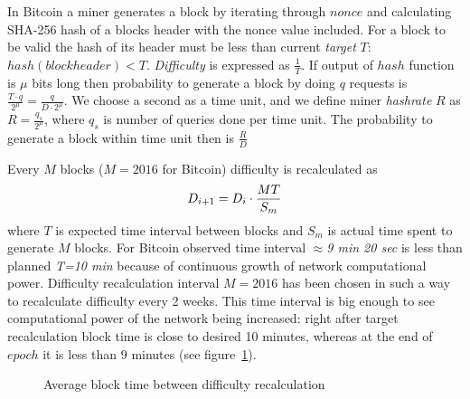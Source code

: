 \documentclass[]{llncs}
\begin{document}
In Bitcoin a miner generates a block by iterating through \(nonce\) and calculating SHA-256 hash of a blocks header with the nonce value included.
For a block to be valid the hash of its header must be less than current \textit{target} \(T\): \( hash(blockheader) < T \). \textit{Difficulty} is expressed as \(\frac{1}{T}\). If output of \(hash\) function is \(\mu\) bits long then probability to generate a block by doing \(q\) requests is \(\frac{T \cdot q}{2^\mu} = \frac{q}{D \cdot 2^\mu}\). We choose a second as a time unit, and we define miner \textit{hashrate} \(R\) as \(R = \frac{q_s}{2^\mu}\), where \(q_s\) is number of queries done per time unit. The probability to generate a block within time unit then is \(\frac{R}{D}\)


Every \(M\) blocks (\(M=2016\) for Bitcoin) difficulty is recalculated as
\begin{equation}
D_{i+1}=D_i \cdot {MT\over S_m}
\end{equation}
where \(T\) is expected time interval between blocks and \(S_m\) is actual time spent to generate \(M\) blocks.
For Bitcoin observed time interval $\approx$\textit{9 min 20 sec} is less than planned \textit{T=10 min} because of continuous growth of network computational power.
Difficulty recalculation interval \(M=2016\) has been chosen in such a way to recalculate difficulty every 2 weeks.
This time interval is big enough to see computational power of the network being increased: right after target recalculation block time is close to desired 10 minutes, whereas at the end of \(epoch\) it is less than 9 minutes (see figure~\ref{fig:image}).

\begin{figure}[H]
\caption{Average block time between difficulty recalculation}
\label{fig:image}
\end{figure}
\end{document}

